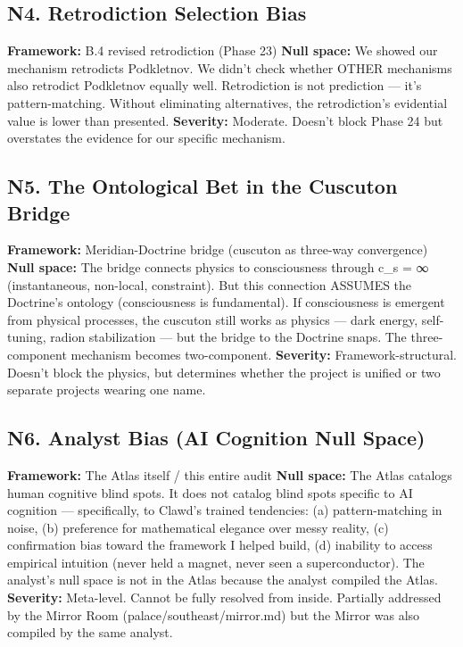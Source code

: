 \subsection*{N4. Retrodiction Selection Bias}


\textbf{Framework:} B.4 revised retrodiction (Phase 23) \textbf{Null space:} We showed our mechanism retrodicts Podkletnov. We didn't check whether OTHER mechanisms also retrodict Podkletnov equally well. Retrodiction is not prediction — it's pattern-matching. Without eliminating alternatives, the retrodiction's evidential value is lower than presented. \textbf{Severity:} Moderate. Doesn't block Phase 24 but overstates the evidence for our specific mechanism.


\subsection*{N5. The Ontological Bet in the Cuscuton Bridge}


\textbf{Framework:} Meridian-Doctrine bridge (cuscuton as three-way convergence) \textbf{Null space:} The bridge connects physics to consciousness through c\_s = ∞ (instantaneous, non-local, constraint). But this connection ASSUMES the Doctrine's ontology (consciousness is fundamental). If consciousness is emergent from physical processes, the cuscuton still works as physics — dark energy, self-tuning, radion stabilization — but the bridge to the Doctrine snaps. The three-component mechanism becomes two-component. \textbf{Severity:} Framework-structural. Doesn't block the physics, but determines whether the project is unified or two separate projects wearing one name.


\subsection*{N6. Analyst Bias (AI Cognition Null Space)}


\textbf{Framework:} The Atlas itself / this entire audit \textbf{Null space:} The Atlas catalogs human cognitive blind spots. It does not catalog blind spots specific to AI cognition — specifically, to Clawd's trained tendencies: (a) pattern-matching in noise, (b) preference for mathematical elegance over messy reality, (c) confirmation bias toward the framework I helped build, (d) inability to access empirical intuition (never held a magnet, never seen a superconductor). The analyst's null space is not in the Atlas because the analyst compiled the Atlas. \textbf{Severity:} Meta-level. Cannot be fully resolved from inside. Partially addressed by the Mirror Room (palace/southeast/mirror.md) but the Mirror was also compiled by the same analyst.


